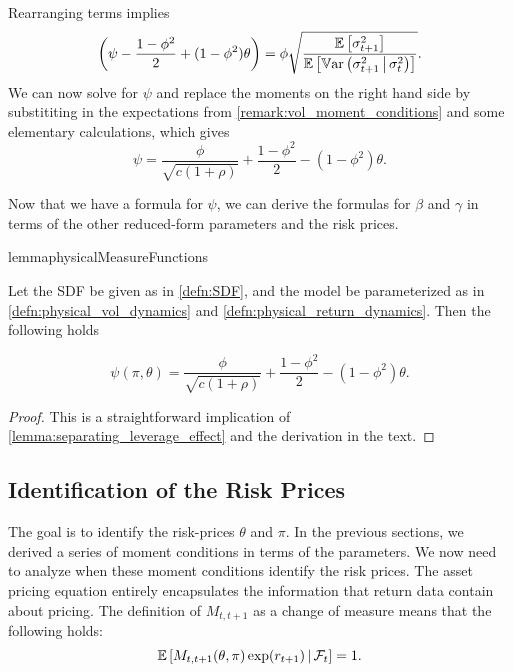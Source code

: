 \documentclass[11pt, letterpaper, twoside]{article}
\begin{document}
%
Rearranging terms implies 
%
\begin{equation}
    \label{eqn:psi_tilde_eqn}
    \left(\psi - \frac{1-\phi^2}{2} + (1-\phi^2)\theta\right) = \phi \sqrt{\frac{\operatorname{\mathbb{E}}\left[\sigma^2_{t+1} \right]}{\operatorname{\mathbb{E}} \left[\operatorname{\mathbb{V}ar}\left(\sigma^2_{t+1} \,\middle\vert\, \sigma^2_t\right)\right]}}.
\end{equation}
%
We can now solve for $\psi$ and replace the moments on the right hand side by substititing in the expectations from \cref{remark:vol_moment_conditions} and some elementary calculations, which gives 
%
\begin{equation}
    \label{eqn:psi_pp_as_func_of_params}
    \psi = \frac{\phi}{\sqrt{c (1 + \rho)}} + \frac{1 - \phi^2}{2} - (1 - \phi^2) \theta.
\end{equation}

Now that we have a formula for $\psi$, we can derive the formulas for $\beta$ and $\gamma$ in terms of the other reduced-form parameters and the risk prices. 

\begin{restatable}{lemma}{physicalMeasureFunctions}

    \label{lemma:psi_function}
    
    Let the SDF be given as in \cref{defn:SDF}, and the model be parameterized as in
    \cref{defn:physical_vol_dynamics} and \cref{defn:physical_return_dynamics}. 
    Then the following holds
    
    \begin{equation}
        \psi(\pi, \theta) = \frac{\phi}{\sqrt{c (1 + \rho)}} + \frac{1 - \phi^2}{2} - (1 - \phi^2) \theta.  
    \end{equation}
\end{restatable}

\begin{proof}
    This is a straightforward implication of \cref{lemma:separating_leverage_effect} and the derivation in the text.
\end{proof}

\subsection{Identification of the Risk Prices}

The goal is to identify the risk-prices $\theta$ and $\pi$. In the previous sections, we derived a series of moment conditions in terms of the parameters. We now need to analyze when these moment conditions identify the risk prices. The asset pricing equation entirely encapsulates the information that return data contain about pricing.  The definition of $M_{t,t+1}$ as a change of measure means that the following holds:
%
\begin{equation}
    \operatorname{\mathbb{E}}\left[ M_{t,t+1}(\theta, \pi) \exp(r_{t+1}) \,\middle\vert\, \mathcal{F}_{t} \right] = 1.
\end{equation}
\end{document}
